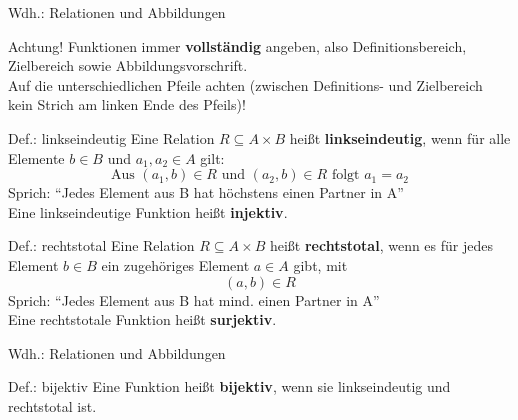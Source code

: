 \begin{frame}{Wdh.: Relationen und Abbildungen}
	\begin{alertblock}{Achtung!}
		Funktionen immer \textbf{vollständig} angeben, also Definitionsbereich, Zielbereich sowie Abbildungsvorschrift. \\
		Auf die unterschiedlichen Pfeile achten (zwischen Definitions- und Zielbereich kein Strich am linken Ende des Pfeils)!
	\end{alertblock}
\end{frame}

\begin{frame}{}%
	\begin{block}{Def.: linkseindeutig}
	\pause
		Eine Relation $R \subseteq A \times B$ heißt \textbf{linkseindeutig}, wenn für alle Elemente $b \in B$ und $a_1, a_2 \in A$ gilt: $$\text{Aus } (a_1,b) \in R \text{ und } (a_2,b) \in R \text{ folgt } a_1 = a_2$$
		Sprich: \enquote{Jedes Element aus B hat höchstens einen Partner in A}\\
		Eine linkseindeutige Funktion heißt \textbf{injektiv}.
	\end{block}
	\pause
	\begin{block}{Def.: rechtstotal}
	\pause
		Eine Relation $R \subseteq A \times B$ heißt \textbf{rechtstotal}, wenn es für jedes Element $b \in B$ ein zugehöriges Element $a \in A$ gibt, mit $$(a,b) \in R$$
		Sprich: \enquote{Jedes Element aus B hat mind. einen Partner in A}\\
		Eine rechtstotale Funktion heißt \textbf{surjektiv}.
	\end{block}
\end{frame}
\begin{frame}{Wdh.: Relationen und Abbildungen}
	\begin{block}{Def.: bijektiv}
		\pause
		Eine Funktion heißt \textbf{bijektiv}, wenn sie linkseindeutig und rechtstotal ist.
	\end{block}
\end{frame}
